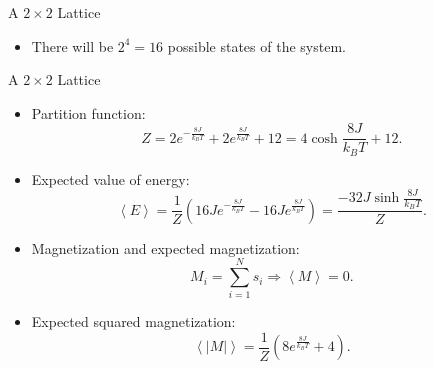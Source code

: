 \documentclass{beamer} %
\begin{document}
\begin{frame}{A $2\times2$ Lattice}
\begin{itemize}
\item There will be $2^{4}=16$ possible states of the system.
\end{itemize}
\begin{figure}[ht]
\begin{center}
\label{fig:spins2x2}
\end{center}
\end{figure}
\end{frame}

\begin{frame}{A $2\times2$ Lattice}
\begin{itemize}
\item Partition function:
\begin{equation}
\label{eq:partition2x2}
Z=2e^{-\frac{8J}{k_{B}T}}+2e^{\frac{8J}{k_{B}T}}+12 = 4\cosh{\frac{8J}{k_{B}T}}+12.
\end{equation}
\item Expected value of energy:
\begin{equation}
\label{eq:expe2x2}
\left<E\right> = \frac{1}{Z}\left(16Je^{-\frac{8J}{k_{B}T}}-16Je^{\frac{8J}{k_{B}T}}\right) = \frac{-32J\sinh{\frac{8J}{k_{B}T}}}{Z}.
\end{equation}
\item Magnetization and expected magnetization:
\begin{equation}
\label{eq:mag}
M_{i}=\sum_{i=1}^{N}s_{i} \Rightarrow \left<M\right>=0.
\end{equation}
\item Expected squared magnetization:
\begin{equation}
\label{eq:expabsm2x2}
\left<\left|M\right|\right> = \frac{1}{Z}\left(8e^{\frac{8J}{k_{B}T}}+4\right).
\end{equation}
\end{itemize}
\end{frame}
\end{document}
